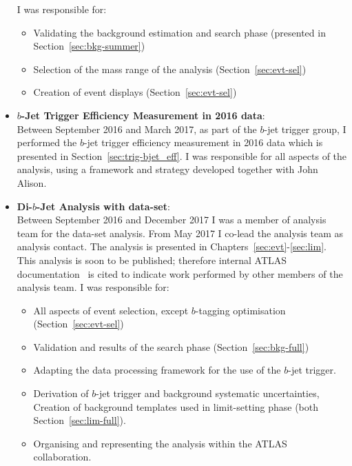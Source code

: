 \begin{itemize}[leftmargin=*]
  I was responsible for:
  \begin{itemize}
    \item Validating the background estimation and search phase (presented in Section~\ref{sec:bkg-summer})
    \item Selection of the mass range of the analysis (Section~\ref{sec:evt-sel})
    \item Creation of event displays (Section~\ref{sec:evt-sel})
  \end{itemize}
  \vspace{1em}
\item\textbf{$b$-Jet Trigger Efficiency Measurement in 2016 data}:\\
  Between September 2016 and March 2017, as part of the $b$-jet trigger group,
  I performed the $b$-jet trigger efficiency measurement in 2016 data which is presented in Section~\ref{sec:trig-bjet_eff}.
  I was responsible for all aspects of the analysis, using a framework and strategy developed together with John Alison.
  \vspace{1em}
\item\textbf{Di-$b$-Jet Analysis  with \lm{} data-set}:\\ 
  Between September 2016 and December 2017 I was a member of analysis team for the \lm{} data-set analysis.
  From May 2017 I co-lead the analysis team as analysis contact.
  The analysis is presented in Chapters~\ref{sec:evt}-\ref{sec:lim}.
  This analysis is soon to be published; therefore internal ATLAS documentation~\cite{dibjet-full_int} is cited to indicate work performed by other members of the analysis team.
  I was responsible for:
  \begin{itemize}
    \item All aspects of event selection, except $b$-tagging optimisation (Section~\ref{sec:evt-sel})
    \item Validation and results of the search phase (Section~\ref{sec:bkg-full})
    \item Adapting the data processing framework for the use of the $b$-jet trigger.
    \item Derivation of $b$-jet trigger and background systematic uncertainties,\\
      Creation of background templates used in limit-setting phase (both Section~\ref{sec:lim-full}).
    \item Organising and representing the analysis within the ATLAS collaboration.

\end{itemize}
\end{itemize}
